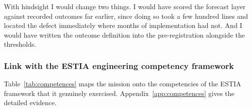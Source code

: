 With hindsight I would change two things. I would have scored the forecast layer against
recorded outcomes far earlier, since doing so took a few hundred lines and located the defect
immediately where months of implementation had not. And I would have written the outcome
definition into the pre-registration alongside the thresholds.

\subsubsection{Link with the ESTIA engineering competency framework}

Table~\ref{tab:competences} maps the mission onto the competencies of the ESTIA framework
that it genuinely exercised. Appendix~\ref{app:competences} gives the detailed evidence.


